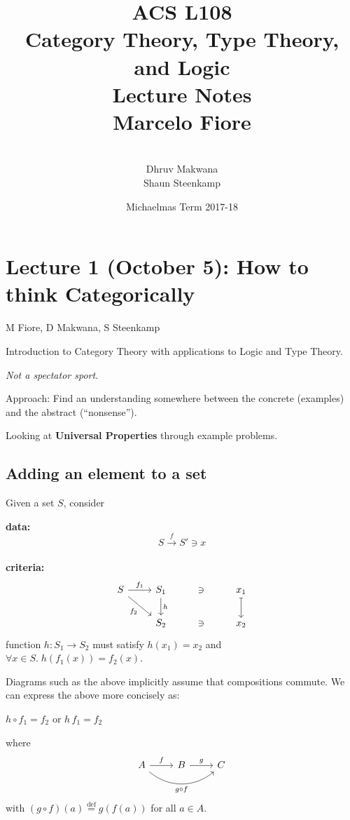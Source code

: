\documentclass[a4paper, 12pt]{article}
\title{ACS L108\\
  Category Theory, Type Theory, and Logic\\
  Lecture Notes\\[4mm]
  \Large Marcelo Fiore}
\author{\mbox{}\\[-8mm]Dhruv Makwana\\ 
  Shaun Steenkamp}
\date{Michaelmas Term 2017-18}
\theoremstyle{definition}
\newcommand{\eqdef}{\stackrel{\text{def}}{=}} %
\newcommand{\comp}{\circ} %
\newcommand{\icomp}{\,} %
\begin{document}
\maketitle

\tableofcontents

\newpage
\section{Lecture 1 (October 5): How to think Categorically}
\vspace*{-5mm}\hspace*{7.75mm}
M Fiore, D Makwana, S Steenkamp
\bigskip

Introduction to Category Theory with applications to Logic and Type Theory.

\emph{Not a spectator sport.}

Approach: Find an understanding somewhere between the concrete (examples) and
the abstract (``nonsense'').

Looking at \textbf{Universal Properties} through example problems.

\subsection{Adding an element to a set}

Given a set $S$, consider

\textbf{data:} $$ S \overset{f}{\rightarrow} S' \ni x $$ \\
\textbf{criteria:} $$
    \begin{tikzcd}
        S \arrow[r, "f_1"]
          \arrow[dr, swap, "f_2"]
          &
        S_1 \arrow[d, "h"] & \ni & x_1 \arrow[d, mapsto]
          \\
          {}&
        S_2 & \ni & x_2
    \end{tikzcd}
$$
\quad function $h : S_1 \rightarrow S_2$ must satisfy $h(x_1) = x_2$ and 
$\forall x \in S .\; h(f_1(x)) = f_2(x)$.

\begin{framed}
Diagrams such as the above implicitly assume that compositions commute.  We
can express the above more concisely as:
\begin{center}
$h\comp f_1 = f_2$
\quad or \quad
$h\icomp f_1 = f_2$
\end{center}
where 
$$
\begin{tikzcd}
    A \arrow[r, "f"] \arrow[rr, swap, bend right=40, "g \circ f"] & B \arrow[r, "g"] & C
\end{tikzcd}
$$
with $(g\comp f)(a)\eqdef g(f(a))$ for all $a\in A$.
\end{framed}
\end{document}
